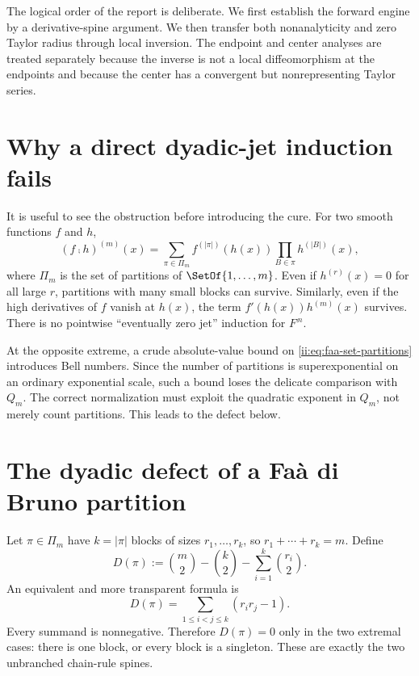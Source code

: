The logical order of the report is deliberate.  We first establish the forward engine
by a derivative-spine argument.  We then transfer both nonanalyticity and zero Taylor
radius through local inversion.  The endpoint and center analyses are treated
separately because the inverse is not a local diffeomorphism at the endpoints and
because the center has a convergent but nonrepresenting Taylor series.

\section{Why a direct dyadic-jet induction fails}

It is useful to see the obstruction before introducing the cure.  For two smooth
functions $f$ and $h$,
\begin{equation}
 (f\comp h)^{(m)}(x)
 =\sum_{\pi\in\Pi_m}
 f^{(|\pi|)}(h(x))\prod_{B\in\pi}h^{(|B|)}(x),
 \label{ii:eq:faa-set-partitions}
\end{equation}
where $\Pi_m$ is the set of partitions of $\SetOf{1,\ldots,m}$.  Even if
$h^{(r)}(x)=0$ for all large $r$, partitions with many small blocks can survive.
Similarly, even if the high derivatives of $f$ vanish at $h(x)$, the term
$f'(h(x))h^{(m)}(x)$ survives.  There is no pointwise ``eventually zero jet''
induction for $F^{\comp n}$.

At the opposite extreme, a crude absolute-value bound on \eqref{ii:eq:faa-set-partitions}
introduces Bell numbers.  Since the number of partitions is superexponential on an
ordinary exponential scale, such a bound loses the delicate comparison with $Q_m$.
The correct normalization must exploit the quadratic exponent in $Q_m$, not merely
count partitions.  This leads to the defect below.

\section{The dyadic defect of a Fa\`a di Bruno partition}
\label{ii:sec:defect}

Let $\pi\in\Pi_m$ have $k=|\pi|$ blocks of sizes
$r_1,\ldots,r_k$, so $r_1+\cdots+r_k=m$.  Define
\begin{equation}
 D(\pi):=\binom m2-\binom k2-\sum_{i=1}^k\binom{r_i}{2}.
 \label{ii:eq:defect}
\end{equation}
An equivalent and more transparent formula is
\begin{equation}
 D(\pi)=\sum_{1\leq i<j\leq k}(r_ir_j-1).
 \label{ii:eq:defect-pairs}
\end{equation}
Every summand is nonnegative.  Therefore $D(\pi)=0$ only in the two extremal cases:
there is one block, or every block is a singleton.  These are exactly the two
unbranched chain-rule spines.


